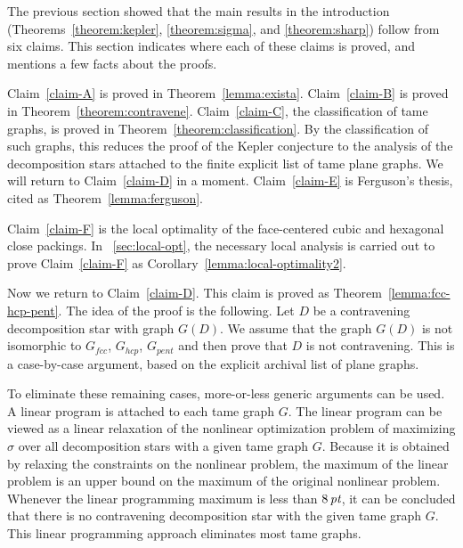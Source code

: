 The previous section showed that the main results in the
introduction (Theorems~\ref{theorem:kepler}, \ref{theorem:sigma},
and \ref{theorem:sharp}) follow from six claims. This section
indicates where each of these claims is proved, and mentions a few
facts about the proofs.

Claim~\ref{claim-A} is proved in Theorem~\ref{lemma:exista}.
Claim~\ref{claim-B} is proved in Theorem~\ref{theorem:contravene}.
Claim~\ref{claim-C}, the classification of tame graphs, is proved in
Theorem~\ref{theorem:classification}. By the classification of such
graphs, this reduces the proof of the Kepler conjecture to the
analysis of the decomposition stars attached to the finite explicit
list of tame plane graphs.  We will return to Claim~\ref{claim-D} in
a moment.  Claim~\ref{claim-E} is Ferguson's thesis, cited as
Theorem~\ref{lemma:ferguson}.

Claim~\ref{claim-F} is the local optimality of the face-centered
cubic and hexagonal close packings.   In
\Chap~\ref{sec:local-opt}, the necessary local analysis is carried
out to prove Claim~\ref{claim-F} as
Corollary~\ref{lemma:local-optimality2}.



Now we return to Claim~\ref{claim-D}. This claim is proved as
Theorem~\ref{lemma:fcc-hcp-pent}.  The idea of the proof is the
following.  Let $D$ be a contravening decomposition star with
graph $G(D)$. We assume that the graph $G(D)$ is not isomorphic to
$G_{fcc}$, $G_{hcp}$, $G_{pent}$ and then prove that $D$ is not
contravening. This is a case-by-case argument, based on the
explicit archival list of plane graphs.

To eliminate these remaining cases, more-or-less generic arguments
can be used.  A linear program is attached to each tame graph $G$.
The linear program can be viewed as a linear relaxation of the
nonlinear optimization problem of maximizing $\sigma$ over all
decomposition stars with a given tame graph $G$. Because it is
obtained by relaxing the constraints on the nonlinear problem, the
maximum of the linear problem is an upper bound on the maximum of
the original nonlinear problem. Whenever the linear programming
maximum is less than $8\,\hbox{\it pt}$, it can be concluded that there is
no contravening decomposition star with the given tame graph $G$.
This linear programming approach eliminates most tame graphs.


